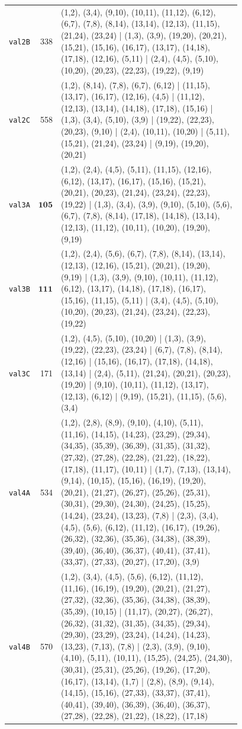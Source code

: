 \begin{landscape}
\begin{longtable}{lr>{\tiny\raggedright\arraybackslash}p{0.78\linewidth}}
\texttt{val2B} & 338 & (1,2), (3,4), (9,10), (10,11), (11,12), (6,12), (6,7), (7,8), (8,14), (13,14), (12,13), (11,15), (21,24), (23,24) | (1,3), (3,9), (19,20), (20,21), (15,21), (15,16), (16,17), (13,17), (14,18), (17,18), (12,16), (5,11) | (2,4), (4,5), (5,10), (10,20), (20,23), (22,23), (19,22), (9,19) \\[2pt]
\texttt{val2C} & 558 & (1,2), (8,14), (7,8), (6,7), (6,12) | (11,15), (13,17), (16,17), (12,16), (4,5) | (11,12), (12,13), (13,14), (14,18), (17,18), (15,16) | (1,3), (3,4), (5,10), (3,9) | (19,22), (22,23), (20,23), (9,10) | (2,4), (10,11), (10,20) | (5,11), (15,21), (21,24), (23,24) | (9,19), (19,20), (20,21) \\[2pt]
\texttt{val3A} & $\mathbf{105}$ & (1,2), (2,4), (4,5), (5,11), (11,15), (12,16), (6,12), (13,17), (16,17), (15,16), (15,21), (20,21), (20,23), (21,24), (23,24), (22,23), (19,22) | (1,3), (3,4), (3,9), (9,10), (5,10), (5,6), (6,7), (7,8), (8,14), (17,18), (14,18), (13,14), (12,13), (11,12), (10,11), (10,20), (19,20), (9,19) \\[2pt]
\texttt{val3B} & $\mathbf{111}$ & (1,2), (2,4), (5,6), (6,7), (7,8), (8,14), (13,14), (12,13), (12,16), (15,21), (20,21), (19,20), (9,19) | (1,3), (3,9), (9,10), (10,11), (11,12), (6,12), (13,17), (14,18), (17,18), (16,17), (15,16), (11,15), (5,11) | (3,4), (4,5), (5,10), (10,20), (20,23), (21,24), (23,24), (22,23), (19,22) \\[2pt]
\texttt{val3C} & 171 & (1,2), (4,5), (5,10), (10,20) | (1,3), (3,9), (19,22), (22,23), (23,24) | (6,7), (7,8), (8,14), (12,16) | (15,16), (16,17), (17,18), (14,18), (13,14) | (2,4), (5,11), (21,24), (20,21), (20,23), (19,20) | (9,10), (10,11), (11,12), (13,17), (12,13), (6,12) | (9,19), (15,21), (11,15), (5,6), (3,4) \\[2pt]
\texttt{val4A} & 534 & (1,2), (2,8), (8,9), (9,10), (4,10), (5,11), (11,16), (14,15), (14,23), (23,29), (29,34), (34,35), (35,39), (36,39), (31,35), (31,32), (27,32), (27,28), (22,28), (21,22), (18,22), (17,18), (11,17), (10,11) | (1,7), (7,13), (13,14), (9,14), (10,15), (15,16), (16,19), (19,20), (20,21), (21,27), (26,27), (25,26), (25,31), (30,31), (29,30), (24,30), (24,25), (15,25), (14,24), (23,24), (13,23), (7,8) | (2,3), (3,4), (4,5), (5,6), (6,12), (11,12), (16,17), (19,26), (26,32), (32,36), (35,36), (34,38), (38,39), (39,40), (36,40), (36,37), (40,41), (37,41), (33,37), (27,33), (20,27), (17,20), (3,9) \\[2pt]
\texttt{val4B} & 570 & (1,2), (3,4), (4,5), (5,6), (6,12), (11,12), (11,16), (16,19), (19,20), (20,21), (21,27), (27,32), (32,36), (35,36), (34,38), (38,39), (35,39), (10,15) | (11,17), (20,27), (26,27), (26,32), (31,32), (31,35), (34,35), (29,34), (29,30), (23,29), (23,24), (14,24), (14,23), (13,23), (7,13), (7,8) | (2,3), (3,9), (9,10), (4,10), (5,11), (10,11), (15,25), (24,25), (24,30), (30,31), (25,31), (25,26), (19,26), (17,20), (16,17), (13,14), (1,7) | (2,8), (8,9), (9,14), (14,15), (15,16), (27,33), (33,37), (37,41), (40,41), (39,40), (36,39), (36,40), (36,37), (27,28), (22,28), (21,22), (18,22), (17,18) \\[2pt]

\end{longtable}
\end{landscape}
